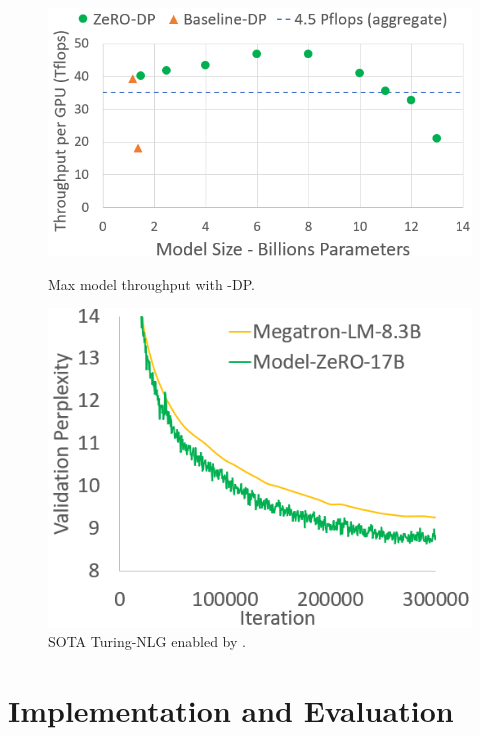 \begin{figure}
   \begin{minipage}[b]{0.55\columnwidth}
    \centering
       \includegraphics[width=\textwidth]{max_data_parallel_throughput.PNG}
        \caption{Max model throughput with \name-DP.} \label{fig:dp_tput}
   \vspace{0.04in}
   \end{minipage}
    \quad
   \begin{minipage}[b]{0.4\columnwidth}
    \centering
       \includegraphics[width=\textwidth]{turing_nlg_17B.PNG}
        \caption{SOTA Turing-NLG enabled by \name.} \label{fig:turing_nlg_17B}
      \vspace{0.08in}
   \end{minipage}
\end{figure}
\section{Implementation and Evaluation}\label{sec:evaluation}

